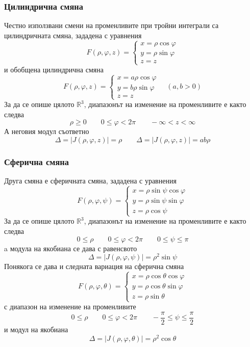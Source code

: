 \documentclass[a4paper,fleqn,12pt]{article}
\theoremstyle{definition}
\begin{document}
\subsubsection{Цилиндрична смяна}
Честно използвани смени на променливите при тройни интеграли са цилиндричната смяна, зададена с уравнения
$$F(\rho, \varphi, z) = \begin{cases} x = \rho \cos \varphi \\  y = \rho \sin \varphi  \\ z = z \end{cases}$$
и обобщена цилиндрична смяна 
$$F(\rho, \varphi, z) = \begin{cases} x = a\rho \cos \varphi \\  y = b\rho \sin \varphi  \\ z = z \end{cases} \quad (a,b > 0)$$
За да се опише цялото $\mathbb{R}^3$, диапазонът на изменение на променливите е както следва 
$$\rho \geq 0 \qquad 0 \leq \varphi < 2\pi \qquad -\infty < z < \infty$$
А неговия модул съответно
$$\Delta = |J(\rho, \varphi, z)| = \rho \qquad \Delta = |J(\rho, \varphi, z)| = ab\rho $$

\subsubsection{Сферична смяна}
Друга смяна е сферичната смяна, зададена с уравнения 
$$F(\rho, \varphi, \psi) = \begin{cases} x = \rho \sin \psi \cos \varphi \\  y = \rho \sin \psi \sin \varphi  \\ z = \rho \cos \psi \end{cases}$$
За да се опише цялото $\mathbb{R}^3$, диапазонът на изменение на променливите е както следва 
$$0 \leq \rho \qquad 0 \leq \varphi < 2 \pi \qquad 0 \leq \psi \leq \pi$$
a модула на якобиана се дава с равенсвото
$$\Delta = |J(\rho, \varphi, \psi)| = \rho^2 \sin \psi$$
Понякога се дава и следната вариация на сферична смяна
$$F(\rho, \varphi, \theta) = \begin{cases} x = \rho \cos \theta \cos \varphi \\  y = \rho \cos \theta \sin \varphi  \\ z = \rho \sin \theta \end{cases}$$
с диапазон на изменение на променливите
$$0 \leq \rho \qquad 0 \leq \varphi < 2 \pi \qquad -\frac{\pi}{2} \leq \psi \leq \frac{\pi}{2}$$
и модул на якобиана
$$\Delta = |J(\rho, \varphi, \theta)| = \rho^2 \cos \theta$$
\end{document}
